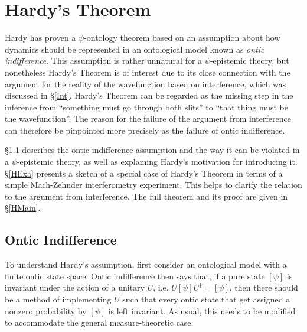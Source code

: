 \documentclass[DIV=calc,fontsize=12pt]{scrartcl} %
\theoremstyle{definition}
\theoremstyle{plain}
\newcommand{\Proj}[1]{\ensuremath{\left [ #1 \right ]}}
\begin{document}
\section{Hardy's Theorem}

\label{Hardy}

Hardy has proven a $\psi$-ontology theorem \cite{Hardy2013} based on
an assumption about how dynamics should be represented in an
ontological model known as \emph{ontic indifference}.  This assumption
is rather unnatural for a $\psi$-epistemic theory, but nonetheless
Hardy's Theorem is of interest due to its close connection with the
argument for the reality of the wavefunction based on interference,
which was discussed in \S\ref{Int}.  Hardy's Theorem can be regarded
as the missing step in the inference from ``something must go through
both slits'' to ``that thing must be the wavefunction''.  The reason
for the failure of the argument from interference can therefore be
pinpointed more precisely as the failure of ontic indifference.

\S\ref{OI} describes the ontic indifference assumption and the way it
can be violated in a $\psi$-epistemic theory, as well as explaining
Hardy's motivation for introducing it.  \S\ref{HExa} presents a sketch
of a special case of Hardy's Theorem in terms of a simple Mach-Zehnder
interferometry experiment.  This helps to clarify the relation to the
argument from interference.  The full theorem and its proof are given
in \S\ref{HMain}.

\subsection{Ontic Indifference}

\label{OI}

To understand Hardy's assumption, first consider an ontological model
with a finite ontic state space.  Ontic indifference then says that,
if a pure state $\Proj{\psi}$ is invariant under the action of a
unitary $U$, i.e. $U \Proj{\psi} U^{\dagger} = \Proj{\psi}$, then
there should be a method of implementing $U$ such that every ontic
state that get assigned a nonzero probability by $\Proj{\psi}$ is
left invariant.  As usual, this needs to be modified to accommodate
the general measure-theoretic case.
\end{document}
